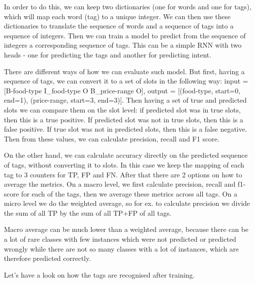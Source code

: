 \documentclass[12pt,titlepage,a4paper]{article}
\begin{document}
In order to do this, we can keep two dictionaries (one for words and one for tags), which will map each word (tag) to a unique integer. We can then use these dictionaries to translate the sequence of words and a sequence of tags into a sequence of integers. Then we can train a model to predict from the sequence of integers a corresponding sequence of tags. This can be a simple RNN with two heads - one for predicting the tags and another for predicting intent. 

There are different ways of how we can evaluate such model. But first, having a sequence of tags, we can convert it to a set of slots in the following way: input = [B-food-type I\_food-type O B\_price-range O], output = [(food-type, start=0, end=1), (price-range, start=3, end=3)]. Then having a set of true and predicted slots we can compare them on the slot level: if predicted slot was in true slots, then this is a true positive. If predicted slot was not in true slots, then this is a false positive. If true slot was not in predicted slots, then this is a false negative. Then from these values, we can calculate precision, recall and F1 score.

On the other hand, we can calculate accuracy directly on the predicted sequence of tags, without converting it to slots. In this case we keep the mapping of each tag to 3 counters for TP, FP and FN. After that there are 2 options on how to average the metrics. On a macro level, we first calculate precision, recall and f1-score for each of the tags, then we average these metrics across all tags. On a micro level we do the weighted average, so for ex. to calculate precision we divide the sum of all TP by the sum of all TP+FP of all tags. 

Macro average can be much lower than a weighted average, because there can be a lot of rare classes with few instances which were not predicted or predicted wrongly while there are not so many classes with a lot of instances, which are therefore predicted correctly.

Let's have a look on how the tags are recognised after training. 
\begin{center}
\end{center}
\end{document}
